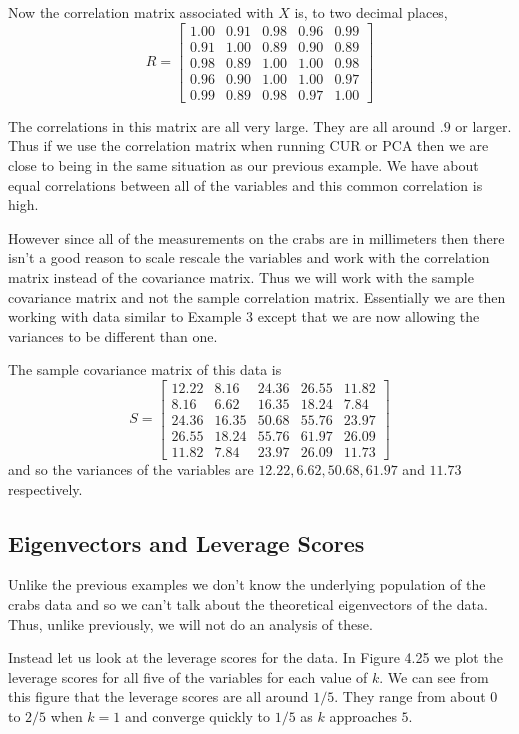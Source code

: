 \documentclass{book}
\begin{document}
Now the correlation matrix associated with $X$ is, to two decimal places,
$$
R=\begin{bmatrix}
1.00& 0.91& 0.98& 0.96& 0.99\\
0.91& 1.00& 0.89& 0.90& 0.89\\
0.98& 0.89& 1.00& 1.00& 0.98\\
0.96& 0.90& 1.00& 1.00& 0.97\\
0.99& 0.89& 0.98& 0.97& 1.00
\end{bmatrix}
$$

The correlations in this matrix are all very large. They are all around $.9$ or larger. Thus if we use the correlation matrix when running CUR or PCA then we are close to being in the same situation as our previous example. We have about equal correlations between all of the variables and this common correlation is high. 

However since all of the measurements on the crabs are in millimeters then there isn't a good reason to scale rescale the variables and work with the correlation matrix instead of the covariance matrix. Thus we will work with the sample covariance matrix and not the sample correlation matrix. Essentially we are then working with data similar to Example 3 except that we are now allowing the variances to be different than one. 

The sample covariance matrix of this data is
$$
S=\begin{bmatrix}
12.22&  8.16& 24.36& 26.55& 11.82\\
 8.16&  6.62& 16.35& 18.24&  7.84\\
24.36& 16.35& 50.68& 55.76& 23.97\\
26.55& 18.24& 55.76& 61.97& 26.09\\
11.82&  7.84& 23.97& 26.09& 11.73
\end{bmatrix}
$$
and so the variances of the variables are $12.22,6.62,50.68,61.97$ and $11.73$ respectively. 

\newpage
\subsection{Eigenvectors and Leverage Scores}

Unlike the previous examples we don't know the underlying population of the crabs data and so we can't talk about the theoretical eigenvectors of the data. Thus, unlike previously, we will not do an analysis of these. 

Instead let us look at the leverage scores for the data. In Figure 4.25 we plot the leverage scores for all five of the variables for each value of $k$. We can see from this figure that the leverage scores are all around $1/5$. They range from about 0 to $2/5$ when $k=1$ and converge quickly to $1/5$ as $k$ approaches $5$. 
\end{document}
